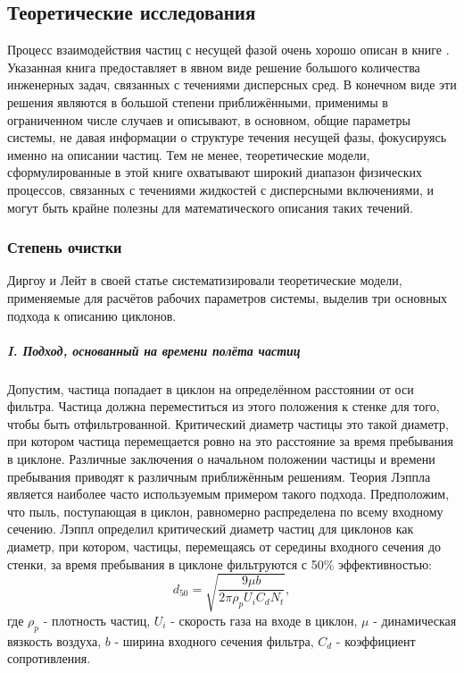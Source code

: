 	\subsection{Теоретические исследования}
	\label{theoreticalOverview}
		Процесс взаимодействия частиц с несущей фазой очень хорошо описан в книге \cite{Richardson}. Указанная книга предоставляет в явном виде решение большого количества инженерных задач, связанных с течениями дисперсных сред. В конечном виде эти решения являются в большой степени приближёнными, применимы в ограниченном числе случаев и описывают, в основном, общие параметры системы, не давая информации о структуре течения несущей фазы, фокусируясь именно на описании частиц. Тем не менее, теоретические модели, сформулированные в этой книге охватывают широкий диапазон физических процессов, связанных с течениями жидкостей с дисперсными включениями, и могут быть крайне полезны для математического описания таких течений.
		\subsubsection*{Степень очистки}
		Диргоу и Лейт \cite{DirgoLeith} в своей статье систематизировали теоретические модели, применяемые для расчётов рабочих параметров системы, выделив три основных подхода к описанию циклонов.
			\subparagraph{I. Подход, основанный на времени полёта частиц\\}
			Допустим, частица попадает в циклон на определённом расстоянии от оси фильтра. Частица должна переместиться из этого положения к стенке для того, чтобы быть отфильтрованной. Критический диаметр частицы это такой диаметр, при котором частица перемещается ровно на это расстояние за время пребывания в циклоне. Различные заключения о начальном положении частицы и времени пребывания приводят к различным приближённым решениям. Теория Лэппла \cite{Lapple} является наиболее часто используемым примером такого подхода. Предположим, что пыль, поступающая в циклон, равномерно распределена по всему входному сечению. Лэппл определил критический диаметр частиц для циклонов как диаметр, при котором, частицы, перемещаясь от середины входного сечения до стенки, за время пребывания в циклоне фильтруются с 50\% эффективностью:
			\begin{equation}
				\label{LappleEquation}
				d_{50} = \sqrt{\frac{9\mu b}{2 \pi \rho_p U_i C_d N_t}},
			\end{equation}
			где $\rho_p$ - плотность частиц, $U_i$ - скорость газа на входе в циклон, $\mu$ - динамическая вязкость воздуха, $b$ - ширина входного сечения фильтра, $C_d$ - коэффициент сопротивления.
			
